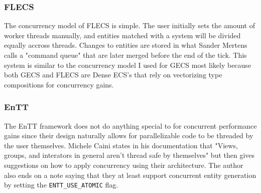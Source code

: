 \subsubsection{FLECS}
The concurrency model of FLECS is simple. The user initially sets the amount of worker threads manually, and entities matched with a system will be divided equally accross threads. Changes to entities are stored in what Sander Mertens calls a "command queue" that are later merged before the end of the tick.\cite{missing_docs} This system is similar to the concurrency model I used for GECS most likely because both GECS and FLECS are Dense ECS's that rely on vectorizing type compositions for concurrency gains.

\subsubsection{EnTT}
The EnTT framework does not do anything special to for concurrent performance gains since their design naturally allows for parallelizable code to be threaded by the user themselves. Michele Caini states in his documentation that "Views, groups, and interators in general aren't thread safe by themselves" but then gives suggestions on how to apply concurrency using their architecture. The author also ends on a note saying that they at least support concurrent entity generation by setting the \texttt{ENTT\_USE\_ATOMIC} flag.\cite{EnTT_multithreading}